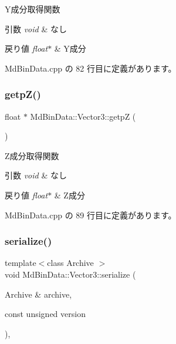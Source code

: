Y成分取得関数 


\begin{DoxyParams}{引数}
{\em void} & なし \\
\hline
\end{DoxyParams}

\begin{DoxyRetVals}{戻り値}
{\em float$\ast$} & Y成分 \\
\hline
\end{DoxyRetVals}


 Md\+Bin\+Data.\+cpp の 82 行目に定義があります。

\mbox{\label{class_md_bin_data_1_1_vector3_a3f0b7ef217f5a065fa86aa3da983b6a4}} 
\subsubsection{\texorpdfstring{getp\+Z()}{getpZ()}}
{\footnotesize\ttfamily float $\ast$ Md\+Bin\+Data\+::\+Vector3\+::getpZ (\begin{DoxyParamCaption}{ }\end{DoxyParamCaption})}



Z成分取得関数 


\begin{DoxyParams}{引数}
{\em void} & なし \\
\hline
\end{DoxyParams}

\begin{DoxyRetVals}{戻り値}
{\em float$\ast$} & Z成分 \\
\hline
\end{DoxyRetVals}


 Md\+Bin\+Data.\+cpp の 89 行目に定義があります。

\mbox{\label{class_md_bin_data_1_1_vector3_af1b8febb3546990575e4b6ba7496b619}} 
\subsubsection{\texorpdfstring{serialize()}{serialize()}}
{\footnotesize\ttfamily template$<$class Archive $>$ \\
void Md\+Bin\+Data\+::\+Vector3\+::serialize (\begin{DoxyParamCaption}\item[{Archive \&}]{archive,  }\item[{const unsigned}]{version }\end{DoxyParamCaption})\hspace{0.3cm}{\ttfamily [inline]}, {\ttfamily [private]}}



